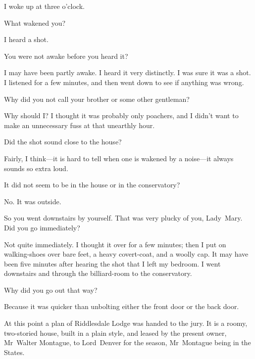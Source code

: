 \begin{dialogue}
 I woke up at three o'clock.

 What wakened you?

 I heard a shot.

 You were not awake before you heard it?

 I may have been partly awake. I heard it very distinctly. I was sure it was a shot. I listened for a few minutes, and then went down to see if anything was wrong.

 Why did you not call your brother or some other gentleman?

  Why should I\@? I thought it was probably only poachers, and I didn't want to make an unnecessary fuss at that unearthly hour.

 Did the shot sound close to the house?

 Fairly, I think—it is hard to tell when one is wakened by a noise—it always sounds so extra loud.

 It did not seem to be in the house or in the conservatory?

 No. It was outside.

 So you went downstairs by yourself. That was very plucky of you, Lady~Mary. Did you go immediately?

 Not quite immediately. I thought it over for a few minutes; then I put on walking-shoes over bare feet, a heavy covert-coat, and a woolly cap. It may have been five minutes after hearing the shot that I left my bedroom. I went downstairs and through the billiard-room to the conservatory.

 Why did you go out that way?

 Because it was quicker than unbolting either the front door or the back door.
\end{dialogue}

At this point a plan of Riddlesdale Lodge was handed to the jury. It is a roomy, two-storied house, built in a plain style, and leased by the present owner, Mr~Walter Montague, to Lord~Denver for the season, Mr~Montague being in the States.

